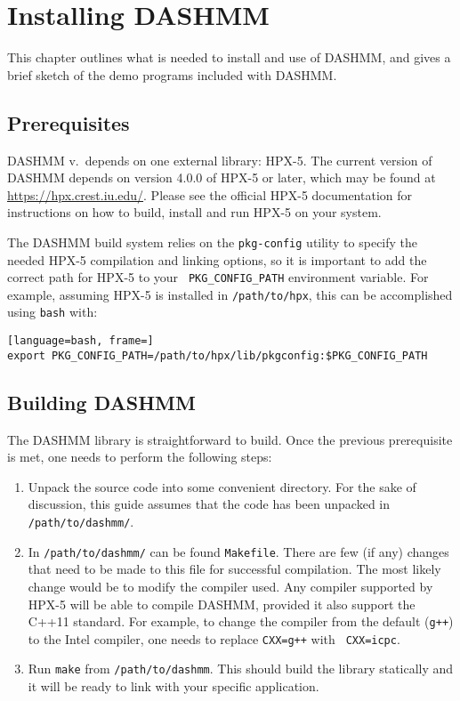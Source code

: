 \chapter{Installing DASHMM}
\label{ch:install}

This chapter outlines what is needed to install and use of DASHMM, and
gives a brief sketch of the demo programs included with DASHMM.

\section{Prerequisites}

DASHMM v.\ \version depends on one external library: HPX-5. The current
version of DASHMM depends on version 4.0.0 of HPX-5 or later, which
may be found at \url{https://hpx.crest.iu.edu/}. Please see the
official HPX-5 documentation for instructions on how to build, install
and run HPX-5 on your system.

The DASHMM build system relies on the {\tt pkg-config} utility to
specify the needed HPX-5 compilation and linking options, so it is
important to add the correct path for HPX-5 to your {\tt
  PKG\_CONFIG\_PATH} environment variable. For example, assuming HPX-5
is installed in {\tt /path/to/hpx}, this can be accomplished using
{\tt bash} with:

\begin{lstlisting}[language=bash, frame=]
export PKG_CONFIG_PATH=/path/to/hpx/lib/pkgconfig:$PKG_CONFIG_PATH
\end{lstlisting}

\section{Building DASHMM}

The DASHMM library is straightforward to build. Once the previous
prerequisite is met, one needs to perform the following steps:

\begin{enumerate}
\item Unpack the source code into some convenient directory. For the
  sake of discussion, this guide assumes that the code has been
  unpacked in {\tt /path/to/dashmm/}.
\item In {\tt /path/to/dashmm/} can be found {\tt Makefile}. There are
  few (if any) changes that need to be made to this file for
  successful compilation. The most likely change would be to modify
  the compiler used. Any compiler supported by HPX-5 will be able to
  compile DASHMM, provided it also support the C++11 standard. For
  example, to change the compiler from the default ({\tt g++}) to the
  Intel compiler, one needs to replace {\tt CXX=g++} with {\tt
    CXX=icpc}.
\item Run {\tt make} from {\tt /path/to/dashmm}. This should build the
  library statically and it will be ready to link with your specific
  application.
\end{enumerate}

